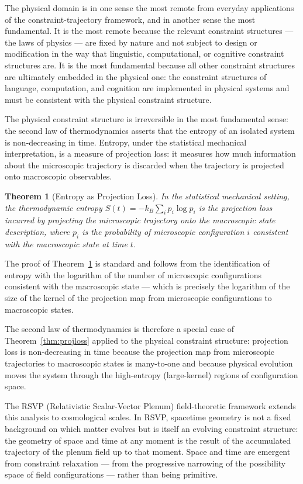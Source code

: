 \documentclass[12pt, twoside]{article}
\theoremstyle{plain}
\newtheorem{theorem}{Theorem}[section]
\theoremstyle{definition}
\theoremstyle{remark}
\begin{document}
The physical domain is in one sense the most remote from everyday
applications of the constraint-trajectory framework,
and in another sense the most fundamental.
It is the most remote because the relevant constraint structures
— the laws of physics — are fixed by nature and not subject to design
or modification in the way that linguistic, computational, or
cognitive constraint structures are.
It is the most fundamental because all other constraint structures
are ultimately embedded in the physical one: the constraint structures
of language, computation, and cognition are implemented in physical
systems and must be consistent with the physical constraint structure.

The physical constraint structure is irreversible in the most
fundamental sense: the second law of thermodynamics asserts that
the entropy of an isolated system is non-decreasing in time.
Entropy, under the statistical mechanical interpretation,
is a measure of projection loss: it measures how much information
about the microscopic trajectory is discarded when the trajectory
is projected onto macroscopic observables.

\begin{theorem}[Entropy as Projection Loss]
\label{thm:entropy}
In the statistical mechanical setting, the thermodynamic entropy
$S(t) = -k_B \sum_i p_i \log p_i$
is the projection loss incurred by projecting the microscopic
trajectory onto the macroscopic state description,
where $p_i$ is the probability of microscopic configuration $i$
consistent with the macroscopic state at time $t$.
\end{theorem}

The proof of Theorem~\ref{thm:entropy} is standard and follows
from the identification of entropy with the logarithm of the
number of microscopic configurations consistent with the macroscopic
state — which is precisely the logarithm of the size of the
kernel of the projection map from microscopic configurations
to macroscopic states.

The second law of thermodynamics is therefore a special case of
Theorem~\ref{thm:projloss} applied to the physical constraint structure:
projection loss is non-decreasing in time because the projection map
from microscopic trajectories to macroscopic states is many-to-one
and because physical evolution moves the system through the
high-entropy (large-kernel) regions of configuration space.

The RSVP (Relativistic Scalar-Vector Plenum) field-theoretic
framework extends this analysis to cosmological scales.
In RSVP, spacetime geometry is not a fixed background on which
matter evolves but is itself an evolving constraint structure:
the geometry of space and time at any moment is the result of
the accumulated trajectory of the plenum field up to that moment.
Space and time are emergent from constraint relaxation —
from the progressive narrowing of the possibility space of
field configurations — rather than being primitive.
\end{document}
